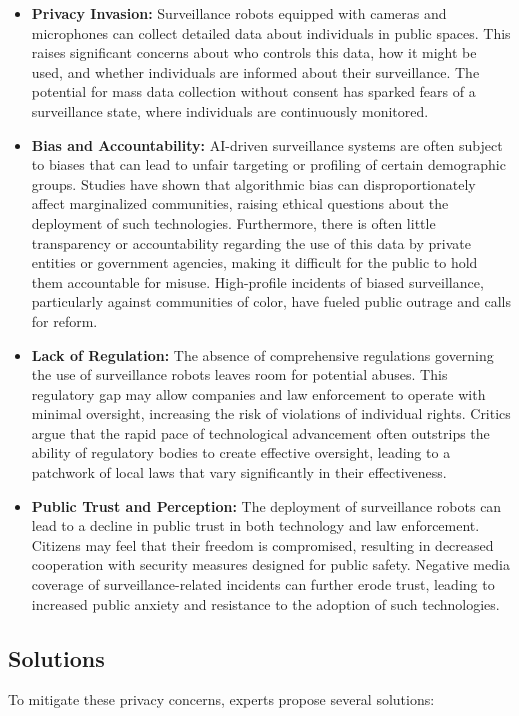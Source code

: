 \begin{itemize}
    \item \textbf{Privacy Invasion:} Surveillance robots equipped with cameras and microphones can collect detailed data about individuals in public spaces. This raises significant concerns about who controls this data, how it might be used, and whether individuals are informed about their surveillance. The potential for mass data collection without consent has sparked fears of a surveillance state, where individuals are continuously monitored.
    
    \item \textbf{Bias and Accountability:} AI-driven surveillance systems are often subject to biases that can lead to unfair targeting or profiling of certain demographic groups. Studies have shown that algorithmic bias can disproportionately affect marginalized communities, raising ethical questions about the deployment of such technologies. Furthermore, there is often little transparency or accountability regarding the use of this data by private entities or government agencies, making it difficult for the public to hold them accountable for misuse. High-profile incidents of biased surveillance, particularly against communities of color, have fueled public outrage and calls for reform.

    \item \textbf{Lack of Regulation:} The absence of comprehensive regulations governing the use of surveillance robots leaves room for potential abuses. This regulatory gap may allow companies and law enforcement to operate with minimal oversight, increasing the risk of violations of individual rights. Critics argue that the rapid pace of technological advancement often outstrips the ability of regulatory bodies to create effective oversight, leading to a patchwork of local laws that vary significantly in their effectiveness.

    \item \textbf{Public Trust and Perception:} The deployment of surveillance robots can lead to a decline in public trust in both technology and law enforcement. Citizens may feel that their freedom is compromised, resulting in decreased cooperation with security measures designed for public safety. Negative media coverage of surveillance-related incidents can further erode trust, leading to increased public anxiety and resistance to the adoption of such technologies.
\end{itemize}

\subsection{Solutions}
To mitigate these privacy concerns, experts propose several solutions:

